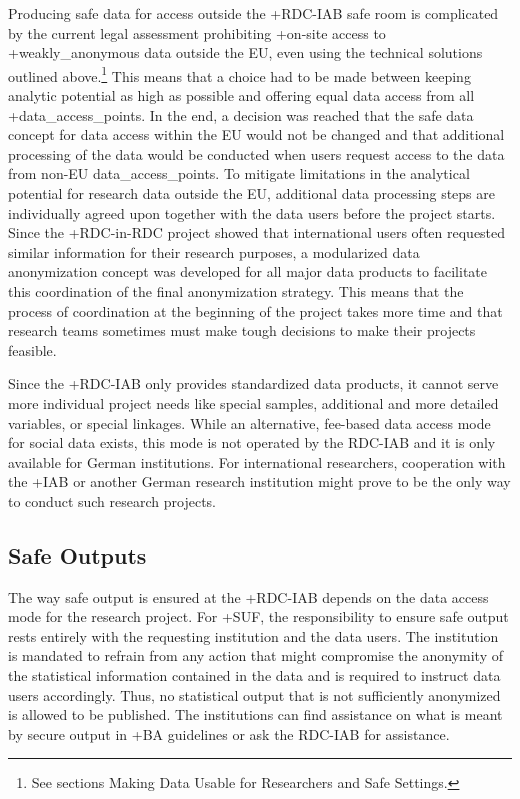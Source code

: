 \documentclass[
]{book}
\begin{document}
Producing safe data for access outside the +RDC-IAB\textbar{} safe room is complicated by the current legal assessment prohibiting +on-site\textbar{} access to +weakly\_anonymous\textbar{} data outside the EU, even using the technical solutions outlined above.\footnote{See sections Making Data Usable for Researchers and Safe Settings.} This means that a choice had to be made between keeping analytic potential as high as possible and offering equal data access from all +data\_access\_points\textbar. In the end, a decision was reached that the safe data concept for data access within the EU would not be changed and that additional processing of the data would be conducted when users request access to the data from non-EU data\_access\_points. To mitigate limitations in the analytical potential for research data outside the EU, additional data processing steps are individually agreed upon together with the data users before the project starts. Since the +RDC-in-RDC\textbar{} project showed that international users often requested similar information for their research purposes, a modularized data anonymization concept was developed for all major data products to facilitate this coordination of the final anonymization strategy. This means that the process of coordination at the beginning of the project takes more time and that research teams sometimes must make tough decisions to make their projects feasible.

Since the +RDC-IAB\textbar{} only provides standardized data products, it cannot serve more individual project needs like special samples, additional and more detailed variables, or special linkages. While an alternative, fee-based data access mode for social data exists, this mode is not operated by the RDC-IAB and it is only available for German institutions. For international researchers, cooperation with the +IAB\textbar{} or another German research institution might prove to be the only way to conduct such research projects.

\hypertarget{safe-outputs}{%
\subsection{Safe Outputs}\label{safe-outputs}}

The way safe output is ensured at the +RDC-IAB\textbar{} depends on the data access mode for the research project. For +SUF\textbar, the responsibility to ensure safe output rests entirely with the requesting institution and the data users. The institution is mandated to refrain from any action that might compromise the anonymity of the statistical information contained in the data and is required to instruct data users accordingly. Thus, no statistical output that is not sufficiently anonymized is allowed to be published. The institutions can find assistance on what is meant by secure output in +BA\textbar{} guidelines \citep{statistikderbundesagenturfurarbeit2018} or ask the RDC-IAB for assistance.
\end{document}
